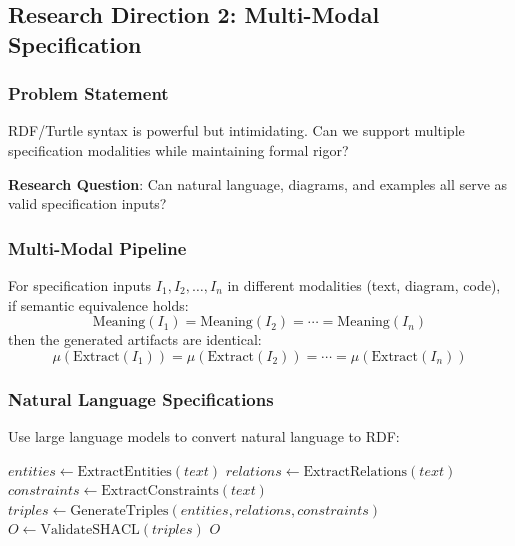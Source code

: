 \subsection{Research Direction 2: Multi-Modal Specification}

\subsubsection{Problem Statement}

RDF/Turtle syntax is powerful but intimidating. Can we support multiple specification modalities while maintaining formal rigor?

\textbf{Research Question}: Can natural language, diagrams, and examples all serve as valid specification inputs?

\subsubsection{Multi-Modal Pipeline}

\begin{theorem}
    For specification inputs $I_1, I_2, \ldots, I_n$ in different modalities (text, diagram, code), if semantic equivalence holds:
    \begin{equation}
        \text{Meaning}(I_1) = \text{Meaning}(I_2) = \cdots = \text{Meaning}(I_n)
    \end{equation}
    then the generated artifacts are identical:
    \begin{equation}
        \mu(\text{Extract}(I_1)) = \mu(\text{Extract}(I_2)) = \cdots = \mu(\text{Extract}(I_n))
    \end{equation}
\end{theorem}

\subsubsection{Natural Language Specifications}

Use large language models to convert natural language to RDF:

\begin{algorithm}
\caption{NL-to-RDF Translation}
\begin{algorithmic}[1]
    \State $entities \gets \text{ExtractEntities}(text)$ 
    \State $relations \gets \text{ExtractRelations}(text)$ 
    \State $constraints \gets \text{ExtractConstraints}(text)$ 
    \State $triples \gets \text{GenerateTriples}(entities, relations, constraints)$
    \State $O \gets \text{ValidateSHACL}(triples)$ 
    \State \Return $O$
\EndProcedure
\end{algorithmic}
\end{algorithm}

